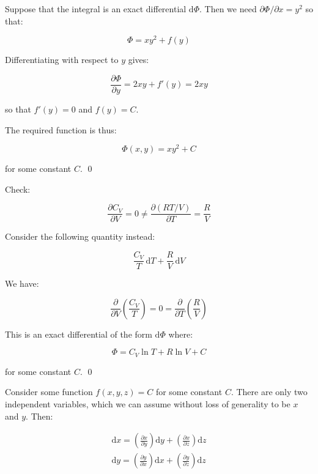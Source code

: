 \documentclass[12pt]{article}
\begin{document}
Suppose that the integral is an exact differential $\mathrm{d}\Phi$. Then we need $\partial \Phi/\partial x = y^{2}$ so that:

\begin{equation}
    \Phi = xy^{2} + f(y)
\end{equation}

Differentiating with respect to $y$ gives:

\begin{equation}
    \frac{\partial \Phi}{\partial y} = 2xy + f'(y) = 2xy
\end{equation}

so that $f'(y) = 0$ and $f(y) = C$.

The required function is thus:

\begin{equation}
    \Phi(x, y) = xy^{2} + C
\end{equation}

for some constant $C$.
\qed


Check:

\begin{equation}
    \frac{\partial C_{V}}{\partial V} = 0 \ne \frac{\partial (RT/V)}{\partial T} = \frac{R}{V}
\end{equation}

Consider the following quantity instead:

\begin{equation}
    \frac{C_{V}}{T} \, \mathrm{d}T + \frac{R}{V} \, \mathrm{d}V
\end{equation}

We have:

\begin{equation}
    \frac{\partial}{\partial V} \left( \frac{C_{V}}{T} \right) = 0 = \frac{\partial}{\partial T} \left( \frac{R}{V} \right)
\end{equation}

This is an exact differential of the form $\mathrm{d}\Phi$ where:

\begin{equation}
    \Phi = C_{V} \ln{T} + R \ln{V} + C
\end{equation}

for some constant $C$.
\qed


Consider some function $f(x, y, z) = C$ for some constant $C$. There are only two independent variables, which we can assume without loss of generality to be $x$ and $y$. Then:

\begin{equation}
\begin{split}
    \mathrm{d}x = \left( \frac{\partial x}{\partial y} \right) \mathrm{d}y + \left( \frac{\partial x}{\partial z} \right) \mathrm{d}z \\
    \mathrm{d}y = \left( \frac{\partial y}{\partial x} \right) \mathrm{d}x + \left( \frac{\partial y}{\partial z} \right) \mathrm{d}z \\
\end{split}
\end{equation}
\end{document}
